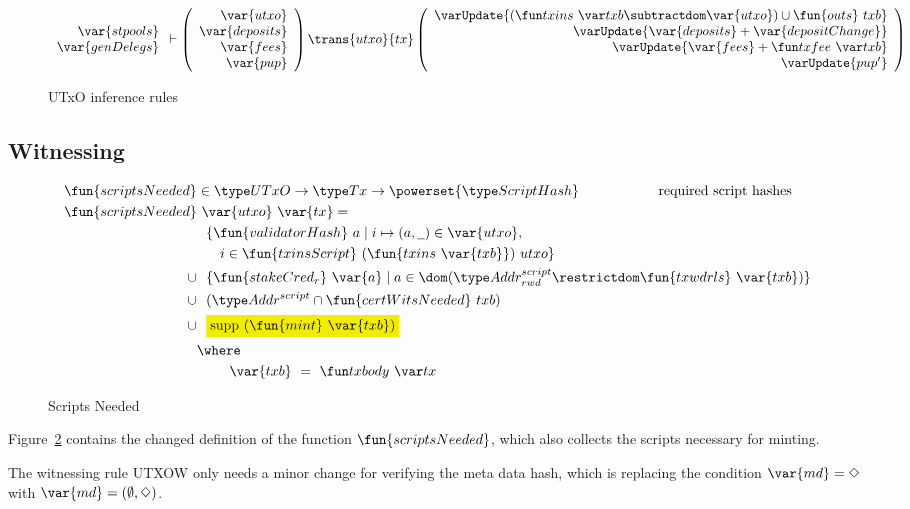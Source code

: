 \begin{figure}[htb]
\begin{equation}
{\begin{array}{r}
        \var{stpools}\\
        \var{genDelegs}\\
      \end{array}
      \vdash
      \left(
      \begin{array}{r}
        \var{utxo} \\
        \var{deposits} \\
        \var{fees} \\
        \var{pup}\\
      \end{array}
      \right)
      \trans{utxo}{tx}
      \left(
      \begin{array}{r}
        \varUpdate{(\txins{txb} \subtractdom \var{utxo}) \cup \fun{outs}~{txb}}  \\
        \varUpdate{\var{deposits} + \var{depositChange}} \\
        \varUpdate{\var{fees} + \txfee{txb}} \\
        \varUpdate{pup'}\\
      \end{array}
      \right)
    }
  \end{equation}
  \caption{UTxO inference rules}
  \label{fig:rules:utxo-shelley}
\end{figure}


\subsection*{Witnessing}

\begin{figure}[htb]
  \begin{align*}
    \fun{scriptsNeeded} & \in \UTxO \to \Tx \to \powerset{\ScriptHash} \hspace{2cm} \text{required script hashes} \\
    \fun{scriptsNeeded} &~\var{utxo}~\var{tx} = \\
    & ~~\{ \fun{validatorHash}~a \mid i \mapsto (a, \wcard) \in \var{utxo},\\
    & ~~~~~i\in\fun{txinsScript}~{(\fun{txins~\var{txb}})}~{utxo}\} \\
    \cup & ~~\{ \fun{stakeCred_{r}}~\var{a} \mid a \in \dom (\AddrRWDScr
           \restrictdom \fun{txwdrls}~\var{txb}) \} \\
      \cup & ~~(\AddrScr \cap \fun{certWitsNeeded}~{txb}) \\
      \cup & ~~\hldiff{\supp~(\fun{mint}~\var{txb})} \\
    & \where \\
    & ~~~~~~~ \var{txb}~=~\txbody{tx}
  \end{align*}
  \caption{Scripts Needed}
  \label{fig:functions-witnesses}
\end{figure}

Figure~\ref{fig:functions-witnesses} contains the changed definition
of the function $\fun{scriptsNeeded}$, which also collects the scripts
necessary for minting.

The witnessing rule UTXOW only needs a minor change for verifying the meta data hash,
which is replacing the condition $\var{md} = \Nothing$ with $\var{md} = (\emptyset, \Nothing)$.
